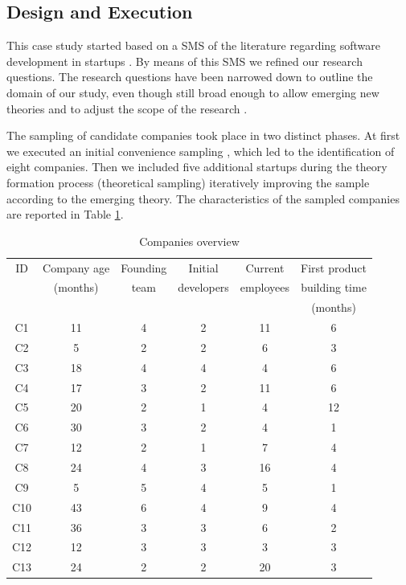 \documentclass[10pt,journal,letterpaper,compsoc]{IEEEtran}
\begin{document}
\subsection{Design and Execution}
\label{desex}


This case study started based on a SMS of the literature regarding software 
development in startups \cite{SMS}. By means of this SMS we refined our research 
questions. The research questions have been narrowed down to outline the domain 
of our study, even though still broad enough to allow emerging new theories and 
to adjust the scope of the research \cite{Corbin1990}. 

The sampling of candidate companies took place in two distinct phases. At first 
we executed an initial convenience sampling \cite{Dawson2009}, which led to the 
identification of eight companies. Then we included five additional startups 
during the theory formation process (theoretical sampling) iteratively improving 
the sample according to the emerging theory. The characteristics of the sampled 
companies are reported in Table \ref{t_interviews-stats}. 


\begin{table}[!t]
\renewcommand{\arraystretch}{1.3}
\caption{Companies overview} 
\label{t_interviews-stats}
\centering
\begin{tabular}{|c||c||c||c||c||c|}

\hline
    ID  &  Company age & Founding & Initial & Current & First product  \\
    &   (months)   & team   & developers  & employees  &  building time \\
                    &      & &   &  & (months)   \\
   \hline
C1    & 11    & 4     & 2     & 11    & 6   \\
C2    & 5     & 2     & 2     & 6     & 3      \\
C3    & 18    & 4     & 4     & 4     & 6      \\
C4    & 17    & 3     & 2     & 11    & 6     \\
C5    & 20    & 2     & 1     & 4     & 12   \\
C6    & 30    & 3     & 2     & 4     & 1      \\
C7    & 12    & 2     & 1     & 7     & 4      \\
C8    & 24    & 4     & 3     & 16    & 4    \\
C9    & 5     & 5     & 4     & 5     & 1     \\
C10   & 43    & 6     & 4     & 9     & 4      \\
C11   & 36    & 3     & 3     & 6     & 2     \\
C12   & 12    & 3     & 3     & 3     & 3      \\
C13   & 24    & 2     & 2     & 20    & 3     \\
 
\hline
\end{tabular}
\end{table}
\end{document}
